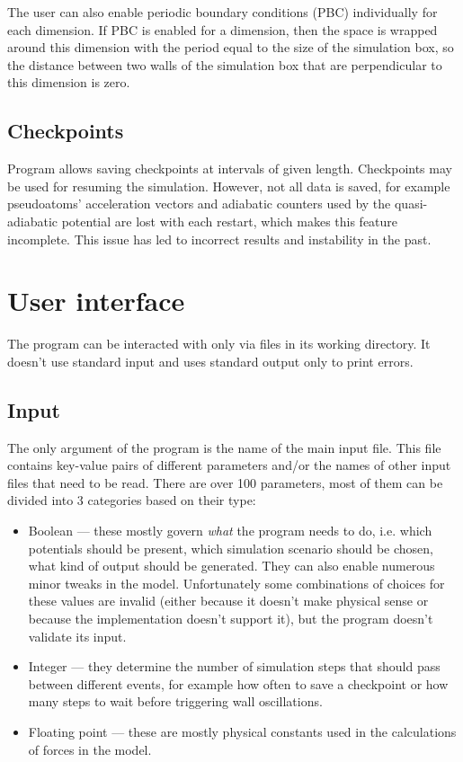 The user can also enable periodic boundary conditions (PBC) individually for each dimension. If PBC is enabled for a dimension, then the space is wrapped around this dimension with the period equal to the size of the simulation box, so the distance between two walls of the simulation box that are perpendicular to this dimension is zero.   


\subsection{Checkpoints}
Program allows saving checkpoints at intervals of given length. Checkpoints may be used for resuming the simulation. However, not all data is saved, for example pseudoatoms' acceleration vectors and adiabatic counters used by the quasi-adiabatic potential are lost with each restart, which makes this feature incomplete. This issue has led to incorrect results and instability in the past. 

\section{User interface}

The program can be interacted with only via files in its working directory. It doesn't use standard input and uses standard output only to print errors.

\subsection{Input}\label{ref:input}

The only argument of the program is the name of the main input file. This file contains key-value pairs of different parameters and/or the names of other input files that need to be read. There are over 100 parameters, most of them can be divided into 3 categories based on their type:

\begin{itemize}
    \item Boolean --- these mostly govern \emph{what} the program needs to do, i.e. which potentials should be present, which simulation scenario should be chosen, what kind of output should be generated. They can also enable numerous minor tweaks in the model. Unfortunately some combinations of choices for these values are invalid (either because it doesn't make physical sense or because the implementation doesn't support it), but the program doesn't validate its input.
    \item Integer --- they determine the number of simulation steps that should pass between different events, for example how often to save a checkpoint or how many steps to wait before triggering wall oscillations.
    \item Floating point --- these are mostly physical constants used in the calculations of forces in the model.  
\end{itemize}

